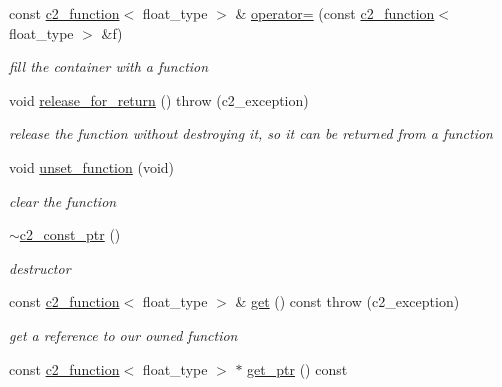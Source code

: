 \begin{DoxyCompactItemize}
const \hyperlink{classc2__function}{c2\-\_\-function}$<$ float\-\_\-type $>$ \& \hyperlink{classc2__const__ptr_a583d8d415ddcad806bbeb09f62ec6df6}{operator=} (const \hyperlink{classc2__function}{c2\-\_\-function}$<$ float\-\_\-type $>$ \&f)
\begin{DoxyCompactList}\small\item\em fill the container with a function \end{DoxyCompactList}\item 
void \hyperlink{classc2__const__ptr_a278e797ec2e770eaa80e84eb615819ac}{release\-\_\-for\-\_\-return} ()  throw (c2\-\_\-exception)
\begin{DoxyCompactList}\small\item\em release the function without destroying it, so it can be returned from a function \end{DoxyCompactList}\item 
void \hyperlink{classc2__const__ptr_aee1890c1f880174b9859d627d2c79425}{unset\-\_\-function} (void)
\begin{DoxyCompactList}\small\item\em clear the function \end{DoxyCompactList}\item 
\hypertarget{classc2__const__ptr_a13ec57f307039d21c12b20ab4aafda2f}{\hyperlink{classc2__const__ptr_a13ec57f307039d21c12b20ab4aafda2f}{$\sim$c2\-\_\-const\-\_\-ptr} ()}\label{classc2__const__ptr_a13ec57f307039d21c12b20ab4aafda2f}

\begin{DoxyCompactList}\small\item\em destructor \end{DoxyCompactList}\item 
\hypertarget{classc2__const__ptr_a6d9dd4874c62d571d4d016f2de4a8aeb}{const \hyperlink{classc2__function}{c2\-\_\-function}$<$ float\-\_\-type $>$ \& \hyperlink{classc2__const__ptr_a6d9dd4874c62d571d4d016f2de4a8aeb}{get} () const   throw (c2\-\_\-exception)}\label{classc2__const__ptr_a6d9dd4874c62d571d4d016f2de4a8aeb}

\begin{DoxyCompactList}\small\item\em get a reference to our owned function \end{DoxyCompactList}\item 
\hypertarget{classc2__const__ptr_a63812c6959fbef01ade67dfeff760341}{const \hyperlink{classc2__function}{c2\-\_\-function}$<$ float\-\_\-type $>$ $\ast$ \hyperlink{classc2__const__ptr_a63812c6959fbef01ade67dfeff760341}{get\-\_\-ptr} () const }\label{classc2__const__ptr_a63812c6959fbef01ade67dfeff760341}


\end{DoxyCompactItemize}
